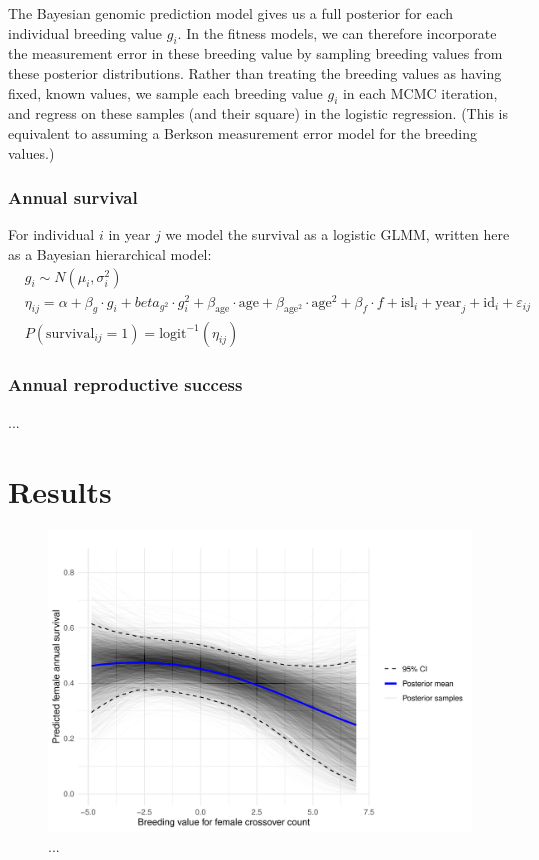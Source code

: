 \documentclass[dvipsnames]{article}
\begin{document}
The Bayesian genomic prediction model gives us a full posterior for each individual breeding value $g_i$. 
In the fitness models, we can therefore incorporate the measurement error in these breeding value by sampling breeding values from these posterior distributions. 
Rather than treating the breeding values as having fixed, known values, we sample each breeding value $g_i$ in each MCMC iteration, and regress on these samples (and their square) in the logistic regression. 
(This is equivalent to assuming a Berkson measurement error model for the breeding values.)

\subsubsection*{Annual survival}

For individual $i$ in year $j$ we model the survival as a logistic GLMM, written here as a Bayesian hierarchical model:
\begin{align*}
    &g_i \sim N(\mu_i, \sigma_i^2) \\
    &\eta_{ij} = \alpha + \beta_g \cdot g_i + beta_{g^2} \cdot g_i^2 + \beta_\text{age} \cdot \text{age} + \beta_{\text{age}^2} \cdot \text{age}^2 + \beta_f \cdot f + \text{isl}_i + \text{year}_j + \text{id}_i + \varepsilon_{ij}\\
    &P(\text{survival}_{ij} = 1) = \text{logit}^{-1}(\eta_{ij})
\end{align*}


\subsubsection*{Annual reproductive success}

...

\section*{Results}

\begin{figure}
    \centering
    \includegraphics[width=0.91\linewidth]{figs/surv_bv_pred_f.pdf}
    \caption{...}
    \label{fig-surv_bv_f}
\end{figure}
\end{document}
